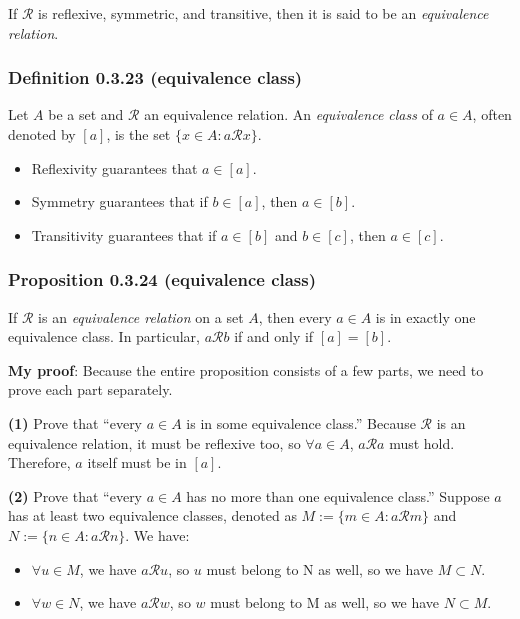 \documentclass[12pt, letterpaper, oneside]{book}
\begin{document}
If $\mathcal{R}$ is reflexive, symmetric, and transitive, then it is said to be
an \textit{equivalence relation}.

\subsubsection*{Definition 0.3.23 (equivalence class)}

Let $A$ be a set and $\mathcal{R}$ an equivalence relation. An
\textit{equivalence class} of $a \in A$, often denoted by $[a]$, is the set
$\{x \in A: a \mathcal{R} x\}$.

\begin{itemize}
  \item Reflexivity guarantees that $a \in [a]$.
  \item Symmetry guarantees that if $b \in [a]$, then $a \in [b]$.
  \item Transitivity guarantees that if $a \in [b]$ and $b \in [c]$, then $a
    \in [c]$.
\end{itemize}

\subsubsection*{Proposition 0.3.24 (equivalence class)}

If $\mathcal{R}$ is an \textit{equivalence relation} on a set $A$, then every
$a \in A$ is in exactly one equivalence class. In particular, $a \mathcal{R} b$
if and only if $[a] = [b]$.

\colorbox{lime!100}{\textbf{My proof}}: Because the entire proposition consists
of a few parts, we need to prove each part separately.

\textbf{(1)} Prove that ``every $a \in A$ is in some equivalence class.''
Because $\mathcal{R}$ is an equivalence relation, it must be reflexive too, so
$\forall a \in A$, $a \mathcal{R} a$ must hold. Therefore, $a$ itself must be
in $[a]$.

\textbf{(2)} Prove that ``every $a \in A$ has no more than one equivalence
class.'' Suppose $a$ has at least two equivalence classes, denoted as $M := \{
m \in A: a \mathcal{R} m\}$ and $N := \{n \in A: a \mathcal{R} n\}$. We have:

\begin{itemize}
  \item $\forall u \in M$, we have $a \mathcal{R} u$, so $u$ must belong to N
    as well, so we have $M \subset N$.
  \item $\forall w \in N$, we have $a \mathcal{R} w$, so $w$ must belong to M
    as well, so we have $N \subset M$.
\end{itemize}
\end{document}
